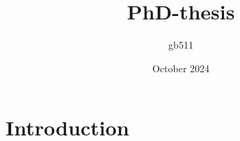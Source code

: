\documentclass{article}
\title{PhD-thesis}
\author{gb511 }
\date{October 2024}
\begin{document}
\maketitle

\section{Introduction}
\end{document}
